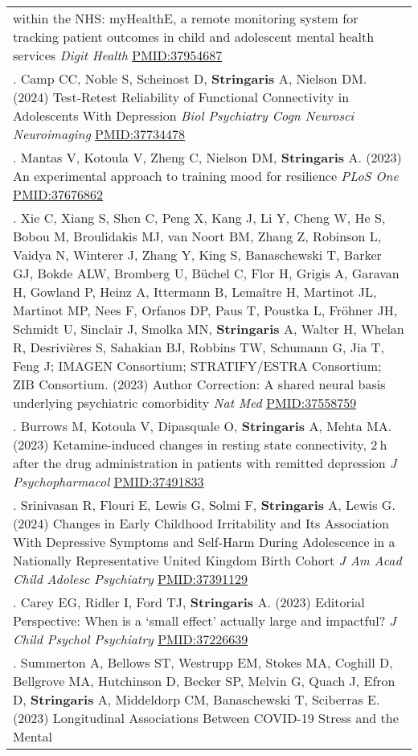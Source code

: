 \documentclass[
]{article}
\begin{document}
\begin{longtable}[]{@{}
  >{\raggedright\arraybackslash}p{}@{}}
within the NHS: myHealthE, a remote monitoring system for tracking
patient outcomes in child and adolescent mental health services
\emph{Digit Health} \url{PMID:37954687} \\
13. Camp CC, Noble S, Scheinost D, \textbf{Stringaris} A, Nielson DM.
(2024) Test-Retest Reliability of Functional Connectivity in Adolescents
With Depression \emph{Biol Psychiatry Cogn Neurosci Neuroimaging}
\url{PMID:37734478} \\
14. Mantas V, Kotoula V, Zheng C, Nielson DM, \textbf{Stringaris} A.
(2023) An experimental approach to training mood for resilience
\emph{PLoS One} \url{PMID:37676862} \\
15. Xie C, Xiang S, Shen C, Peng X, Kang J, Li Y, Cheng W, He S, Bobou
M, Broulidakis MJ, van Noort BM, Zhang Z, Robinson L, Vaidya N, Winterer
J, Zhang Y, King S, Banaschewski T, Barker GJ, Bokde ALW, Bromberg U,
Büchel C, Flor H, Grigis A, Garavan H, Gowland P, Heinz A, Ittermann B,
Lemaître H, Martinot JL, Martinot MP, Nees F, Orfanos DP, Paus T,
Poustka L, Fröhner JH, Schmidt U, Sinclair J, Smolka MN,
\textbf{Stringaris} A, Walter H, Whelan R, Desrivières S, Sahakian BJ,
Robbins TW, Schumann G, Jia T, Feng J; IMAGEN Consortium; STRATIFY/ESTRA
Consortium; ZIB Consortium. (2023) Author Correction: A shared neural
basis underlying psychiatric comorbidity \emph{Nat Med}
\url{PMID:37558759} \\
16. Burrows M, Kotoula V, Dipasquale O, \textbf{Stringaris} A, Mehta MA.
(2023) Ketamine-induced changes in resting state connectivity, 2 h after
the drug administration in patients with remitted depression \emph{J
Psychopharmacol} \url{PMID:37491833} \\
17. Srinivasan R, Flouri E, Lewis G, Solmi F, \textbf{Stringaris} A,
Lewis G. (2024) Changes in Early Childhood Irritability and Its
Association With Depressive Symptoms and Self-Harm During Adolescence in
a Nationally Representative United Kingdom Birth Cohort \emph{J Am Acad
Child Adolesc Psychiatry} \url{PMID:37391129} \\
18. Carey EG, Ridler I, Ford TJ, \textbf{Stringaris} A. (2023) Editorial
Perspective: When is a `small effect' actually large and impactful?
\emph{J Child Psychol Psychiatry} \url{PMID:37226639} \\
19. Summerton A, Bellows ST, Westrupp EM, Stokes MA, Coghill D,
Bellgrove MA, Hutchinson D, Becker SP, Melvin G, Quach J, Efron D,
\textbf{Stringaris} A, Middeldorp CM, Banaschewski T, Sciberras E.
(2023) Longitudinal Associations Between COVID-19 Stress and the Mental

\end{longtable}
\end{document}
